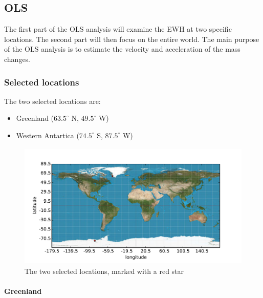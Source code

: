 \subsection{OLS}

The first part of the OLS analysis will examine the EWH at two specific locations. The second part will then focus on the entire world. The main purpose of the OLS analysis is to estimate the velocity and acceleration of the mass changes. 

\subsubsection{Selected locations}

The two selected locations are:
\begin{itemize}
\item Greenland ($63.5^\circ$ N, $49.5^\circ$ W)
\item Western Antartica ($74.5^\circ$ S, $87.5^\circ$ W)
\end{itemize}
\begin{figure}[H]
	\centering
	\includegraphics[height=6cm]{figures/ols-selected-map}
	\caption{The two selected locations, marked with a red star}
\end{figure}

\paragraph{Greenland}

